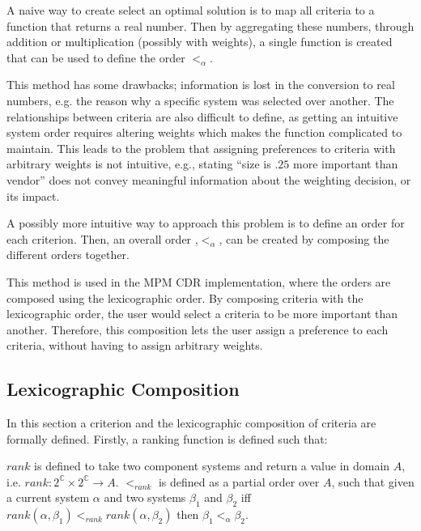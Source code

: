 A naive way to create select an optimal solution is to map all criteria to a function that returns a real number.
Then by aggregating these numbers, through addition or multiplication (possibly with weights), a single function is created that can be used to define the order $<_{\alpha}$. 

This method has some drawbacks; information is lost in the conversion to real numbers, e.g. the reason why a specific system was selected over another.
The relationships between criteria are also difficult to define, as getting an intuitive system order requires altering weights which makes the function complicated to maintain.
This leads to the problem that assigning preferences to criteria with arbitrary weights is not intuitive,
e.g., stating ``size is $.25$ more important than vendor'' does not convey meaningful information about the weighting decision, or its impact.

A possibly more intuitive way to approach this problem is to define an order for each criterion.
Then, an overall order ,$<_{\alpha}$, can be created by composing the different orders together.

This method is used in the MPM \citep{abate2011} CDR implementation, where the orders are composed using the lexicographic order.
By composing criteria with the lexicographic order, the user would select a criteria to be more important than another. 
Therefore, this composition lets the user assign a preference to each criteria, without having to assign arbitrary weights.


\subsection{Lexicographic Composition}
In this section a criterion and the lexicographic composition of criteria are formally defined.
Firstly, a ranking function is defined such that:
\begin{defs}
$rank$ is defined to take two component systems and return a value in domain $A$, i.e. $rank : 2^{\mathbb{C}} \times 2^{\mathbb{C}} \rightarrow A$.
$<_{rank}$ is defined as a partial order over $A$, such that given a current system $\alpha$ and two systems $\beta_1$ and $\beta_2$
iff $rank(\alpha,\beta_1) <_{rank} rank(\alpha,\beta_2)$ then $\beta_1 <_{\alpha} \beta_2$. 
\end{defs}

